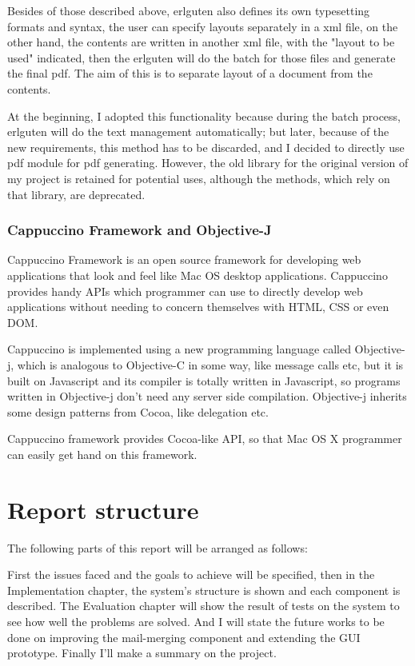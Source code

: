 \documentclass{report}
\begin{document}
  Besides of those described above, erlguten also defines its own typesetting formats and syntax, the user can specify layouts separately in a xml file, on the other hand, the contents are written in another xml file, with the "layout to be used" indicated, then the erlguten will do the batch for those files and generate the final pdf. The aim of this is to separate layout of a document from the contents.

  At the beginning, I adopted this functionality because during the batch process, erlguten will do the text management automatically; but later, because of the new requirements, this method has to be discarded, and I decided to directly use pdf module for pdf generating. However, the old library for the original version of my project is retained for potential uses, although the methods, which rely on that library, are deprecated. 

\subsubsection{Cappuccino Framework and Objective-J}
  Cappuccino Framework\cite{capp} is an open source framework for developing web applications that look and feel like Mac OS desktop applications. Cappuccino provides handy APIs which programmer can use to directly develop web applications without needing to concern themselves with HTML, CSS or even DOM. 

  Cappuccino is implemented using a new programming language called Objective-j, which is analogous to Objective-C in some way, like message calls etc, but it is built on Javascript and its compiler is totally written in Javascript, so programs written in Objective-j don't need any server side compilation. Objective-j inherits some design patterns from Cocoa, like delegation etc.

  Cappuccino framework provides Cocoa-like API, so that Mac OS X programmer can easily get hand on this framework.  

\section{Report structure}
  The following parts of this report will be arranged as follows:

  First the issues faced and the goals to achieve will be specified, then in the Implementation chapter, the system's structure is shown and each component is described. The Evaluation chapter will show the result of tests on the system to see how well the problems are solved. And I will state the future works to be done on improving the mail-merging component and extending the GUI prototype. Finally I'll make a summary on the project.
\end{document}
